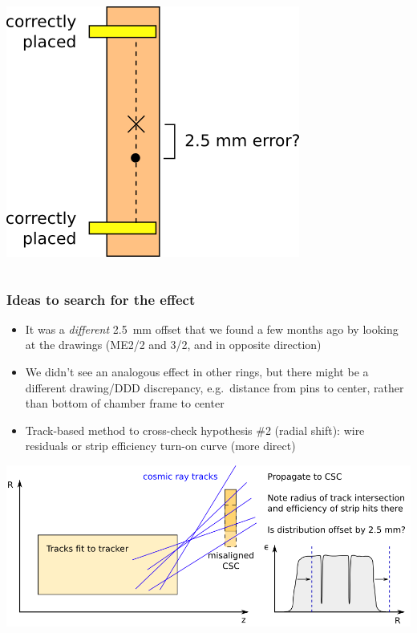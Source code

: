 \documentclass[compress]{beamer}
\begin{document}
\begin{frame}
\begin{itemize}
\begin{columns}
\includegraphics[width=\linewidth]{pins_are_okay.png}
\end{columns}
\end{itemize}
\end{frame}

\begin{frame}
\frametitle{Ideas to search for the effect}

\begin{itemize}\setlength{\itemsep}{0.1 cm}
\item It was a {\it different} 2.5~mm offset that we found a few months ago
  by looking at the drawings (ME2/2 and 3/2, and in opposite direction)

\item We didn't see an analogous effect in other rings, but there
  might be a different drawing/DDD discrepancy, e.g.\ distance from
  pins to center, rather than bottom of chamber frame to center

\item Track-based method to cross-check hypothesis \#2 (radial shift):
  wire residuals or strip efficiency turn-on curve (more direct)
\end{itemize}

\vfill
\includegraphics[width=\linewidth]{way_to_find_radial_misalignment.png}
\end{frame}
\end{document}
